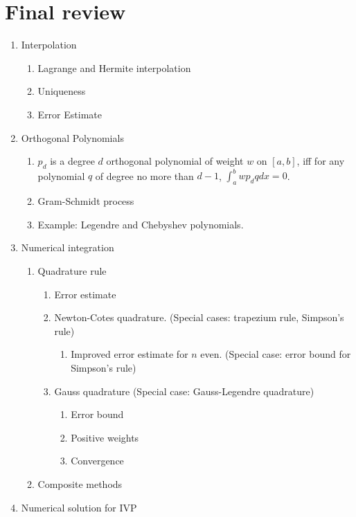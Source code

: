 \documentclass{article} %
\theoremstyle{break}
\begin{document}
\section{Final review}
\begin{enumerate}
  \item Interpolation
  \begin{enumerate}
   \item Lagrange and Hermite interpolation
   \item Uniqueness
   \item Error Estimate
  \end{enumerate}
\item Orthogonal Polynomials
  \begin{enumerate}
  \item $p_d$ is a degree $d$ orthogonal polynomial of weight $w$ on $[a, b]$, iff for any polynomial $q$ of degree no more than $d-1$, $\int_a^bwp_dqdx=0$. 
    \item Gram-Schmidt process
   \item Example: Legendre and Chebyshev polynomials.
   \end{enumerate}
 \item Numerical integration
   \begin{enumerate}
   \item Quadrature rule
     \begin{enumerate}
     \item Error estimate
     \item Newton-Cotes quadrature. (Special cases: trapezium rule, Simpson's rule)
       \begin{enumerate}
        \item Improved error estimate for $n$ even. (Special case: error bound for Simpson's rule)
        \end{enumerate}
     \item Gauss quadrature (Special case: Gauss-Legendre quadrature)
       \begin{enumerate}
        \item Error bound
        \item Positive weights
        \item Convergence
        \end{enumerate}
     \end{enumerate}
    \item Composite methods
   \end{enumerate}
 \item Numerical solution for IVP

\end{enumerate}
\end{document}
